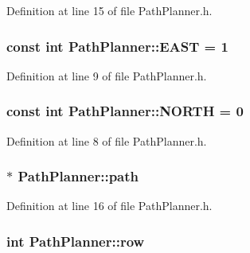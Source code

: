 Definition at line 15 of file Path\-Planner.\-h.

\hypertarget{classPathPlanner_a45399b95a063acdff309e376ccac0fa2}{
\subsubsection[{E\-A\-S\-T}]{\setlength{\rightskip}{0pt plus 5cm}const int Path\-Planner\-::\-E\-A\-S\-T = 1\hspace{0.3cm}{\ttfamily [static]}}}\label{classPathPlanner_a45399b95a063acdff309e376ccac0fa2}


Definition at line 9 of file Path\-Planner.\-h.

\hypertarget{classPathPlanner_a701384da34d065d821a936893c5ddd8d}{
\subsubsection[{N\-O\-R\-T\-H}]{\setlength{\rightskip}{0pt plus 5cm}const int Path\-Planner\-::\-N\-O\-R\-T\-H = 0\hspace{0.3cm}{\ttfamily [static]}}}\label{classPathPlanner_a701384da34d065d821a936893c5ddd8d}


Definition at line 8 of file Path\-Planner.\-h.

\hypertarget{classPathPlanner_a9b41e5ee68a78a45e46003102a6c3b91}{
\subsubsection[{path}]{$\ast$ Path\-Planner\-::path\hspace{0.3cm}{\ttfamily [private]}}}\label{classPathPlanner_a9b41e5ee68a78a45e46003102a6c3b91}


Definition at line 16 of file Path\-Planner.\-h.

\hypertarget{classPathPlanner_a00b0fa8525a5fe9c8088ccaa005c4c54}{
\subsubsection[{row}]{\setlength{\rightskip}{0pt plus 5cm}int Path\-Planner\-::row\hspace{0.3cm}{\ttfamily [private]}}}\label{classPathPlanner_a00b0fa8525a5fe9c8088ccaa005c4c54}


